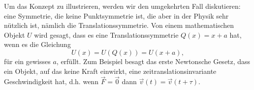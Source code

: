 Um das Konzept zu illustrieren, werden wir den umgekehrten Fall diskutieren:
eine Symmetrie, die keine Punktsymmetrie ist, die aber in der Physik sehr
nützlich ist, nämlich die Translationssymmetrie.  Von einem mathematischen
Objekt \(U\) wird gesagt, dass es eine Translationssymmetrie \(Q(x) = x + a\)
hat, wenn es die Gleichung 
\[
	U(x) = U(Q(x)) = U(x + a),
\]
für ein gewisses \(a\), erfüllt. Zum Beispiel besagt das erste Newtonsche
Gesetz, dass ein Objekt, auf das keine Kraft einwirkt, eine
zeitranslationsinvariante Geschwindigkeit hat, d.h. wenn \(\vec{F} = \vec{0}\)
dann \(\vec{v}(t) = \vec{v}(t + \tau)\).


